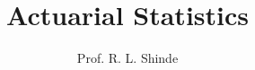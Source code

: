 \documentclass[12pt,onesided,a4paper]{book}
\author{Prof. R. L. Shinde}
\title{Actuarial Statistics}
\theoremstyle{mystyle}
\begin{document}
\large
\maketitle

% 
%
%
%
%
%
%
%
%
%


%
%
%
%
%
%
%
%
%
%
%
%
%
%
%
% 
%
%
%
%
%
%
%
%
%
%
%
%
%
%
%
%
%
\end{document}
